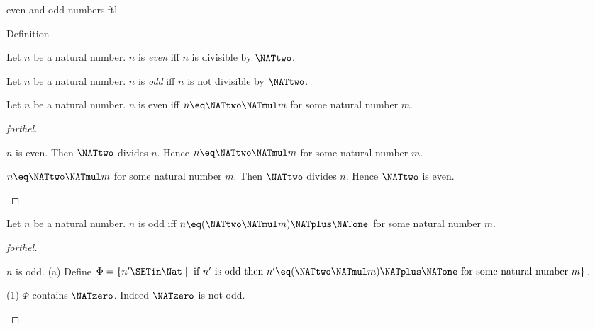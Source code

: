\documentclass{naproche-library}
\begin{document}
\begin{smodule}[title=Even and Odd Numbers]{even-and-odd-numbers.ftl}

\begin{sfragment}{Definition}
  \begin{definition}[forthel,id=ARITHMETIC_15_4521358965847512]
    Let $n$ be a natural number.
    $n$ is \emph{even} iff $n$ is divisible by $\NATtwo$.
  \end{definition}

  \begin{definition}[forthel,id=ARITHMETIC_15_1023652125874596]
    Let $n$ be a natural number.
    $n$ is \emph{odd} iff $n$ is not divisible by $\NATtwo$.
  \end{definition}

  \begin{proposition}[forthel,id=ARITHMETIC_15_0236985458752156]
    Let $n$ be a natural number.
    $n$ is even iff $n \eq \NATtwo \NATmul m$ for some natural number $m$.
  \end{proposition}
  \begin{proof}[forthel]
    \begin{case}{$n$ is even.}
      Then $\NATtwo$ divides $n$.
      Hence $n \eq \NATtwo \NATmul m$ for some natural number $m$.
    \end{case}

    \begin{case}{$n \eq \NATtwo \NATmul m$ for some natural number $m$.}
      Then $\NATtwo$ divides $n$.
      Hence $\NATtwo$ is even.
    \end{case}
  \end{proof}

  \begin{proposition}[forthel,id=ARITHMETIC_15_1023512547854265]
    Let $n$ be a natural number.
    $n$ is odd iff $n \eq (\NATtwo \NATmul m) \NATplus \NATone$ for some natural number $m$.
  \end{proposition}
  \begin{proof}[forthel]
    \begin{case}{$n$ is odd.}
      (a) Define $\Phi = \{ n' \SETin \Nat \mid \text{ if }n'\text{ is odd then }n' \eq (\NATtwo \NATmul m) \NATplus \NATone\text{ for some natural number }m \}$.

      (1) $\Phi$ contains $\NATzero$.
      Indeed $\NATzero$ is not odd.


\end{case}
\end{proof}
\end{sfragment}
\end{smodule}
\end{document}
